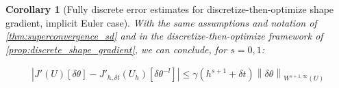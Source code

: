 \documentclass[english,a4paper,10pt,oneside]{scrbook}	%
\theoremstyle{break}
\newtheorem{cor}[equation]{Corollary}
\theoremstyle{remark}
\newcommand{\norm}[1]{\left\lVert#1\right\rVert}
\newcommand{\te}{\theta}
\newcommand{\tred}[1]{\textcolor{red}{#1}}
\newcommand{\dive}{\text{div}}
\begin{document}

%

\begin{cor}[Fully discrete error estimates for discretize-then-optimize shape gradient, implicit Euler case]
\label{cor:superconvergence_sd_fd_IE}
With the same assumptions and notation of \cref{thm:superconvergence_sd} and in the discretize-then-optimize framework of \cref{prop:discrete_shape_gradient}, we can conclude, for $s=0,1$:

\begin{align*}
	\left |J'(U)[\delta \te] - J'_{h,\delta t}(U_h)[\delta \te^{-l}] \right|\leq \gamma  (h^{s+1} + \delta t)\norm{\delta \te}_{W^{{s+1},\infty}(U)}
\end{align*}
\end{cor}
\end{document}
